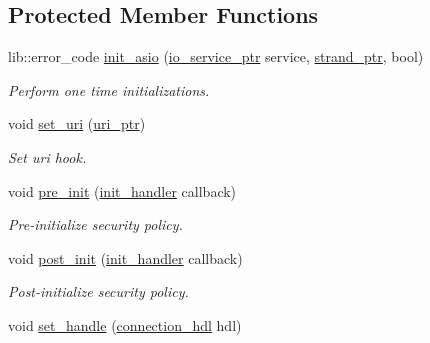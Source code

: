 \subsection*{Protected Member Functions}
\begin{DoxyCompactItemize}
\item 
lib\+::error\+\_\+code \hyperlink{classwebsocketpp_1_1transport_1_1asio_1_1basic__socket_1_1connection_ac458885eaebea790795dbe5e7ab62dc9}{init\+\_\+asio} (\hyperlink{classwebsocketpp_1_1transport_1_1asio_1_1basic__socket_1_1connection_af4c876008bd8610fb497c5d5be56faab}{io\+\_\+service\+\_\+ptr} service, \hyperlink{classwebsocketpp_1_1transport_1_1asio_1_1basic__socket_1_1connection_aed8283ac4f3aa27ada9cd899d579e497}{strand\+\_\+ptr}, bool)
\begin{DoxyCompactList}\small\item\em Perform one time initializations. \end{DoxyCompactList}\item 
void \hyperlink{classwebsocketpp_1_1transport_1_1asio_1_1basic__socket_1_1connection_a303d114dca4ca6ce161fca608e1a7138}{set\+\_\+uri} (\hyperlink{namespacewebsocketpp_aae370ea5ac83a8ece7712cb39fc23f5b}{uri\+\_\+ptr})
\begin{DoxyCompactList}\small\item\em Set uri hook. \end{DoxyCompactList}\item 
void \hyperlink{classwebsocketpp_1_1transport_1_1asio_1_1basic__socket_1_1connection_ab49994bd223b8d0a2eaa11d0029a1b78}{pre\+\_\+init} (\hyperlink{namespacewebsocketpp_1_1transport_aeae75e675c1a334b3b33ab7120b480a5}{init\+\_\+handler} callback)
\begin{DoxyCompactList}\small\item\em Pre-\/initialize security policy. \end{DoxyCompactList}\item 
void \hyperlink{classwebsocketpp_1_1transport_1_1asio_1_1basic__socket_1_1connection_abeee4b73e1f47d21dd42e455f1272d64}{post\+\_\+init} (\hyperlink{namespacewebsocketpp_1_1transport_aeae75e675c1a334b3b33ab7120b480a5}{init\+\_\+handler} callback)
\begin{DoxyCompactList}\small\item\em Post-\/initialize security policy. \end{DoxyCompactList}\item 
void \hyperlink{classwebsocketpp_1_1transport_1_1asio_1_1basic__socket_1_1connection_aac8318bcf892664a4f66a1f1435ed5ce}{set\+\_\+handle} (\hyperlink{namespacewebsocketpp_a6b3d26a10ee7229b84b776786332631d}{connection\+\_\+hdl} hdl)

\end{DoxyCompactItemize}
